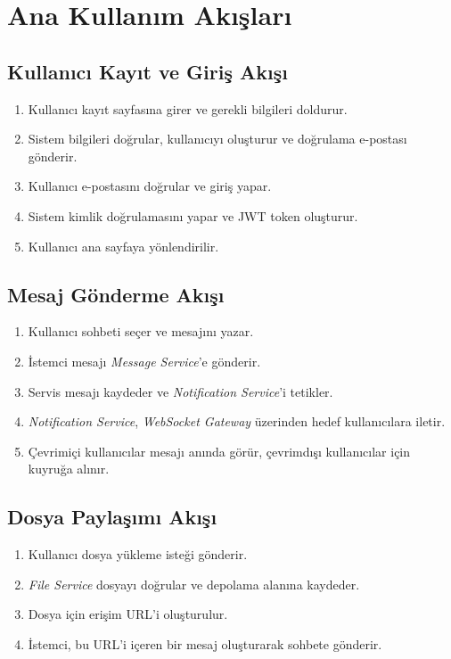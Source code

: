 \section{Ana Kullanım Akışları}

\subsection{Kullanıcı Kayıt ve Giriş Akışı}
\begin{enumerate}
    \item Kullanıcı kayıt sayfasına girer ve gerekli bilgileri doldurur.
    \item Sistem bilgileri doğrular, kullanıcıyı oluşturur ve doğrulama e-postası gönderir.
    \item Kullanıcı e-postasını doğrular ve giriş yapar.
    \item Sistem kimlik doğrulamasını yapar ve JWT token oluşturur.
    \item Kullanıcı ana sayfaya yönlendirilir.
\end{enumerate}

\subsection{Mesaj Gönderme Akışı}
\begin{enumerate}
    \item Kullanıcı sohbeti seçer ve mesajını yazar.
    \item İstemci mesajı \textit{Message Service}'e gönderir.
    \item Servis mesajı kaydeder ve \textit{Notification Service}'i tetikler.
    \item \textit{Notification Service}, \textit{WebSocket Gateway} üzerinden hedef kullanıcılara iletir.
    \item Çevrimiçi kullanıcılar mesajı anında görür, çevrimdışı kullanıcılar için kuyruğa alınır.
\end{enumerate}

\subsection{Dosya Paylaşımı Akışı}
\begin{enumerate}
    \item Kullanıcı dosya yükleme isteği gönderir.
    \item \textit{File Service} dosyayı doğrular ve depolama alanına kaydeder.
    \item Dosya için erişim URL'i oluşturulur.
    \item İstemci, bu URL'i içeren bir mesaj oluşturarak sohbete gönderir.
\end{enumerate}
